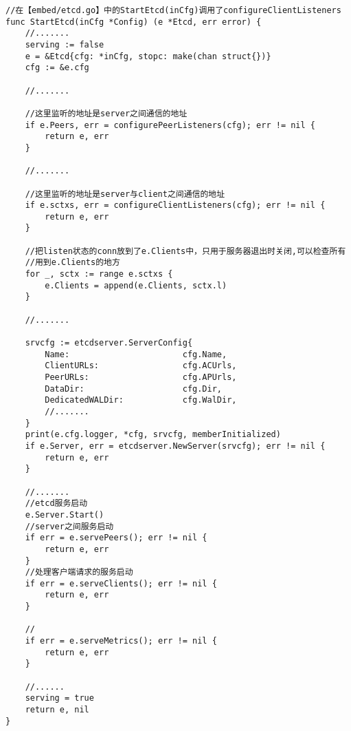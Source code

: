 \begin{verbatim}
//在【embed/etcd.go】中的StartEtcd(inCfg)调用了configureClientListeners
func StartEtcd(inCfg *Config) (e *Etcd, err error) {
	//.......
	serving := false
	e = &Etcd{cfg: *inCfg, stopc: make(chan struct{})}
	cfg := &e.cfg
	
	//.......
	
	//这里监听的地址是server之间通信的地址
	if e.Peers, err = configurePeerListeners(cfg); err != nil {
		return e, err
	}
	
	//.......
	
	//这里监听的地址是server与client之间通信的地址
	if e.sctxs, err = configureClientListeners(cfg); err != nil {
		return e, err
	}
	
	//把listen状态的conn放到了e.Clients中，只用于服务器退出时关闭,可以检查所有
	//用到e.Clients的地方
	for _, sctx := range e.sctxs {
		e.Clients = append(e.Clients, sctx.l) 
	}
	
	//.......
	
	srvcfg := etcdserver.ServerConfig{
		Name:                       cfg.Name,
		ClientURLs:                 cfg.ACUrls,
		PeerURLs:                   cfg.APUrls,
		DataDir:                    cfg.Dir,
		DedicatedWALDir:            cfg.WalDir,
		//.......
	}
	print(e.cfg.logger, *cfg, srvcfg, memberInitialized)
	if e.Server, err = etcdserver.NewServer(srvcfg); err != nil {
		return e, err
	}
	
	//.......
	//etcd服务启动
	e.Server.Start()
	//server之间服务启动
	if err = e.servePeers(); err != nil {
		return e, err
	}
	//处理客户端请求的服务启动
	if err = e.serveClients(); err != nil {
		return e, err
	}
	
	//
	if err = e.serveMetrics(); err != nil {
		return e, err
	}
	
	//......
	serving = true
	return e, nil
}
\end{verbatim}

